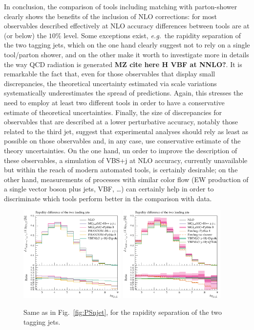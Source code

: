 In conclusion, the comparison of tools including matching with parton-shower clearly shows the benefits of the inclusion of NLO corrections: for most observables described
effectively at NLO accuracy differences between tools are at (or below) the $10\%$ level. 
Some exceptions exist, \emph{e.g.}\ the rapidity separation of the two tagging jets, which
on the one hand clearly suggest not to rely on a single tool/parton shower, and on the other make it worth to investigate more in details the way QCD radiation is
generated {\bf MZ cite here H VBF at NNLO?}. It is remarkable the fact that, even for those observables that display small discrepancies,
the theoretical uncertainty estimated via scale variations systematically underestimates the spread of predictions. Again, this stresses the need
 to employ at least two different tools in order to have a conservative estimate of theoretical uncertainties. Finally, the size of discrepancies for observables that are described at a lower perturbative accuracy, notably those related to the third jet, suggest that
experimental analyses should rely as least as possible on those observables and, in any case, use conservative estimate of the theory 
uncertainties. On the one hand, un order to improve the
description of these observables, a simulation of VBS+j at NLO accuracy, currently unavailable but within the reach of modern 
automated tools, is certainly desirable; on the other hand, measurements of processes with similar 
color flow (EW production of a single vector boson plus jets,
 VBF, \ldots) can certainly help in order to discriminate which tools perform better in the comparison with data.

\begin{figure}[hbt]
\centering
\includegraphics[width=0.47\textwidth]{figures/LOPS/Deltay_jj.pdf}
\includegraphics[width=0.47\textwidth]{figures/NLOPS/Deltay_jj.pdf}
\caption{Same as in Fig.~\protect\ref{fig:PSnjet}, for the rapidity separation of the two tagging jets.}
\label{fig:PSdyjj}
\end{figure}

